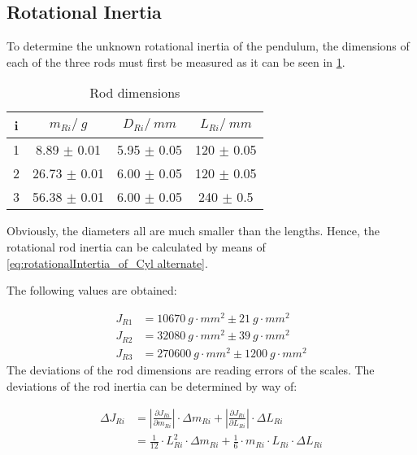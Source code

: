         \subsection{Rotational Inertia}
            To determine the unknown rotational inertia of the pendulum, the dimensions of each of the three rods must first be measured
            as it can be seen in \cref{rod dimensions}.\par
            \begin{table}[H]
                \centering
                \caption[Rod dimensions]{Rod dimensions}
                \label{rod dimensions}
                \begin{tabular}{@{}cccc@{}}
                    \toprule
                    i & $ m_{Ri} / \SI{}{g} $   & $ D_{Ri} / \SI{}{mm} $    & $ L_{Ri} / \SI{}{mm} $ \\
                    \midrule
                    1 & 8.89 $\pm$ 0.01         & 5.95 $\pm$ 0.05           & 120 $\pm$ 0.05 \\
                    2 & 26.73 $\pm$ 0.01        & 6.00 $\pm$ 0.05           & 120 $\pm$ 0.05 \\
                    3 & 56.38 $\pm$ 0.01        & 6.00 $\pm$ 0.05           & 240 $\pm$ 0.5 \\
                    \bottomrule
                \end{tabular}
            \end{table}
            Obviously, the diameters all are much smaller than the lengths. Hence, the rotational rod inertia can be calculated
            by means of \cref{eq:rotationalIntertia_of_Cyl alternate}.\par
            The following values are obtained:\par
            \begin{align}
                J_{R1}  &=\SI{10670}{g\cdot mm^2} \pm \SI{21}{g\cdot mm^2}\\
                J_{R2}  &=\SI{32080}{g\cdot mm^2} \pm \SI{39}{g\cdot mm^2}\\
                J_{R3}  &=\SI{270600}{g\cdot mm^2} \pm \SI{1200}{g\cdot mm^2}
            \end{align}
            The deviations of the rod dimensions are reading errors of the scales. The deviations of the rod inertia can be determined by way of:\par
            \begin{align}
                \Delta J_{Ri}   &=\left| \frac{\partial J_{Ri}}{\partial m_{Ri}} \right| \cdot \Delta m_{Ri} + \left| \frac{\partial J_{Ri}}{\partial L_{Ri}} \right| \cdot \Delta L_{Ri} \nonumber\\
                                &=\frac{1}{12}\cdot L_{Ri}^2\cdot \Delta m_{Ri} + \frac{1}{6}\cdot m_{Ri}\cdot L_{Ri}\cdot \Delta L_{Ri}
            \end{align}
